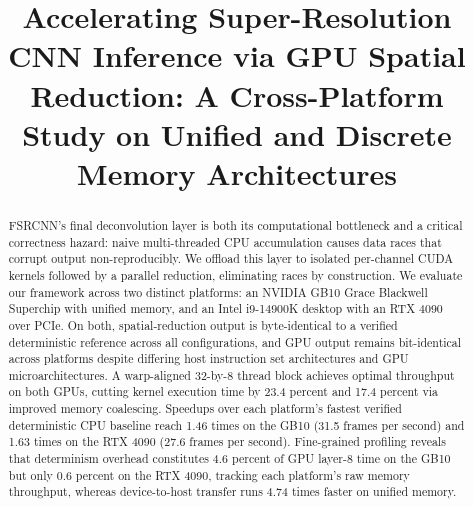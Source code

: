 \documentclass[conference]{IEEEtran}
\begin{document}
\title{Accelerating Super-Resolution CNN Inference via GPU Spatial Reduction: A Cross-Platform Study on Unified and Discrete Memory Architectures}

\author{
\and
{}
}

\maketitle

\begin{abstract}
FSRCNN's final deconvolution layer is both its computational bottleneck and a critical correctness hazard: naive multi-threaded CPU accumulation causes data races that corrupt output non-reproducibly. We offload this layer to isolated per-channel CUDA kernels followed by a parallel reduction, eliminating races by construction. We evaluate our framework across two distinct platforms: an NVIDIA GB10 Grace Blackwell Superchip with unified memory, and an Intel i9-14900K desktop with an RTX 4090 over PCIe. On both, spatial-reduction output is byte-identical to a verified deterministic reference across all configurations, and GPU output remains bit-identical across platforms despite differing host instruction set architectures and GPU microarchitectures. A warp-aligned 32-by-8 thread block achieves optimal throughput on both GPUs, cutting kernel execution time by 23.4 percent and 17.4 percent via improved memory coalescing. Speedups over each platform's fastest verified deterministic CPU baseline reach 1.46 times on the GB10 (31.5 frames per second) and 1.63 times on the RTX 4090 (27.6 frames per second). Fine-grained profiling reveals that determinism overhead constitutes 4.6 percent of GPU layer-8 time on the GB10 but only 0.6 percent on the RTX 4090, tracking each platform's raw memory throughput, whereas device-to-host transfer runs 4.74 times faster on unified memory.
\end{abstract}
\end{document}
